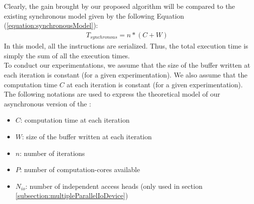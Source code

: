 	Clearly, the gain brought by our proposed algorithm will be compared to the existing synchronous model given by the following Equation (\ref{equation:synchronousModel}):
	\begin{equation}
	\begin{aligned}
		T_{synchronous}	= n * (C + W)
		\label{equation:synchronousModel}
	\end{aligned}
	\end{equation}
	In this model, all the instructions are serialized.   Thus, the total execution time is simply the sum of all the execution times.\\

	To conduct our experimentations, we assume that the size of the buffer written at each iteration is constant (for a given experimentation).   We also assume that the computation time $C$ at each iteration is constant (for a given experimentation).\\
	The following notations are used to express the theoretical model of our asynchronous version of the \toolTargetSoftware:
	\begin{itemize}
		\item $C$: computation time at each iteration
		\item $W$: size of the buffer written at each iteration
		\item $n$: number of iterations
		\item $P$: number of computation-cores available
		\item $N_{io}$: number of independent \notationIO\space access heads (only used in section \ref{subsection:multipleParallelIoDevice})\\
	\end{itemize}


